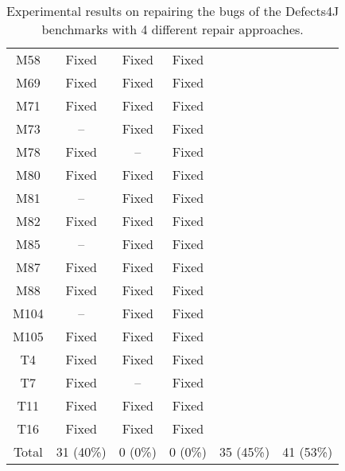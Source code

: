 \begin{table}[!t]
{\begin{tabular}{|c|c|c|c|c|c|}
M58               & Fixed     & Fixed     &Fixed   \\
M69               & Fixed     & Fixed     &Fixed   \\
M71               & Fixed     & Fixed     &Fixed   \\
M73               & --        & Fixed     &Fixed   \\
M78               & Fixed     & --        &Fixed   \\
M80               & Fixed     & Fixed     &Fixed   \\
M81               & --        & Fixed     &Fixed   \\
M82               & Fixed     & Fixed     &Fixed   \\
M85               & --        & Fixed     &Fixed   \\
M87               & Fixed     & Fixed     &Fixed   \\
M88               & Fixed     & Fixed     &Fixed   \\
M104              & --        & Fixed     &Fixed   \\
M105              & Fixed     & Fixed     &Fixed   \\
\hline
T4                & Fixed     & Fixed     &Fixed   \\
T7                & Fixed     & --        &Fixed   \\
T11               & Fixed     & Fixed     &Fixed   \\
T16               & Fixed     & Fixed     &Fixed   \\
\hline
Total             & 31 (40\%) & 0 (0\%)   & 0 (0\%)   & 35 (45\%) & 41 (53\%)\\
\hline 
\end{tabular}%
}
\caption{Experimental results on repairing the bugs of the Defects4J benchmarks with 4 different repair approaches.}
\end{table}

